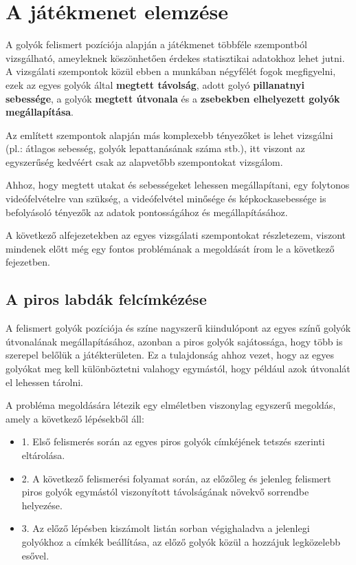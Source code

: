 \section{A játékmenet elemzése}
\label{section:analyze_gameplay}
A golyók felismert pozíciója alapján a játékmenet többféle szempontból vizsgálható, ameyleknek köszönhetően érdekes statisztikai adatokhoz lehet jutni. A vizsgálati szempontok közül ebben a munkában négyfélét fogok megfigyelni, ezek az egyes golyók által \textbf{megtett távolság}, adott golyó \textbf{pillanatnyi sebessége}, a golyók \textbf{megtett útvonala} és a \textbf{zsebekben elhelyezett golyók megállapítása}.
\par Az említett szempontok alapján más komplexebb tényezőket is lehet vizsgálni (pl.: átlagos sebesség, golyók lepattanásának száma stb.), itt viszont az egyszerűség kedvéért csak az alapvetőbb szempontokat vizsgálom.
\par Ahhoz, hogy megtett utakat és sebességeket lehessen megállapítani, egy folytonos videófelvételre van szükség, a videófelvétel minősége és képkockasebessége is befolyásoló tényezők az adatok pontosságához és megállapításához.
\par A következő alfejezetekben az egyes vizsgálati szempontokat részletezem, viszont mindenek előtt még egy fontos problémának a megoldását írom le a következő fejezetben.

\subsection{A piros labdák felcímkézése}
\label{subsection:piros_labda_cimke}
A felismert golyók pozíciója és színe nagyszerű kiindulópont az egyes színű golyók útvonalának megállapításához, azonban a piros golyók sajátossága, hogy több is szerepel belőlük a játékterületen. Ez a tulajdonság ahhoz vezet, hogy az egyes golyókat meg kell különböztetni valahogy egymástól, hogy például azok útvonalát el lehessen tárolni.
\par A probléma megoldására létezik egy elméletben viszonylag egyszerű megoldás, amely a következő lépésekből áll:

\begin{itemize}
    \item 1. Első felismerés során az egyes piros golyók címkéjének tetszés szerinti eltárolása.
    \item 2. A következő felismerési folyamat során, az előzőleg és jelenleg felismert piros golyók egymástól viszonyított távolságának növekvő sorrendbe helyezése.
    \item 3. Az előző lépésben kiszámolt listán sorban végighaladva a jelenlegi golyókhoz a címkék beállítása, az előző golyók közül a hozzájuk legközelebb esővel.
\end{itemize}

